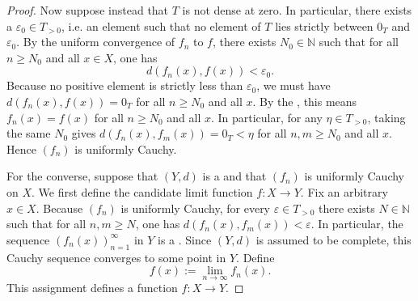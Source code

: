 \begin{proof}
    Now suppose instead that $T$ is not dense at zero. In particular, there exists a  $\varepsilon_0 \in T_{>0}$, i.e. an element such that no element of $T$ lies strictly between $0_T$ and $\varepsilon_0$. By the uniform convergence of $f_n$ to $f$, there exists $N_0 \in \mathbb{N}$ such that for all $n \geq N_0$ and all $x \in X$, one has
    $$d(f_n(x), f(x)) < \varepsilon_0.$$
    Because no positive element is strictly less than $\varepsilon_0$, we must have $d(f_n(x), f(x)) = 0_T$ for all $n \geq N_0$ and all $x$. By the , this means $f_n(x) = f(x)$ for all $n \geq N_0$ and all $x$. In particular, for any $\eta \in T_{>0}$, taking the same $N_0$ gives $d(f_n(x), f_m(x)) = 0_T < \eta$ for all $n, m \geq N_0$ and all $x$. Hence $(f_n)$ is uniformly Cauchy.

    For the converse, suppose that $(Y, d)$ is a  and that $(f_n)$ is uniformly Cauchy on $X$. We first define the candidate limit function $f : X \to Y$. Fix an arbitrary $x \in X$. Because $(f_n)$ is uniformly Cauchy, for every $\varepsilon \in T_{>0}$ there exists $N \in \mathbb{N}$ such that for all $n, m \geq N$, one has $d(f_n(x), f_m(x)) < \varepsilon$. In particular, the sequence $(f_n(x))_{n=1}^\infty$ in $Y$ is a . Since $(Y, d)$ is assumed to be complete, this Cauchy sequence converges to some point in $Y$. Define
    $$f(x) := \lim_{n \to \infty} f_n(x).$$
    This assignment defines a function $f : X \to Y$.


\end{proof}
